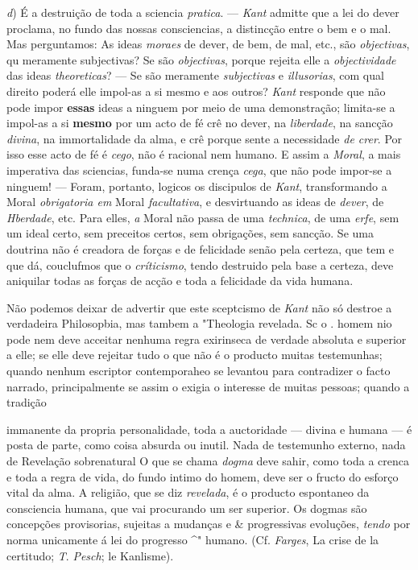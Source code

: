 \emph{d}) É a destruição de toda a sciencia \emph{pratica}. --- \emph{Kant} admitte que a lei do dever proclama, no fundo das nossas consciencias, a distincção entre o bem e o mal. Mas perguntamos: As ideas \emph{moraes} de dever, de bem, de mal, etc., são \emph{objectivas}, qu meramente subjectivas? Se são \emph{objectivas}, porque rejeita elle a \emph{objectividade} das ideas \emph{theoreticas}? --- Se são meramente \emph{subjectivas} e \emph{illusorias}, com qual direito poderá elle impol-as a si mesmo e aos outros? \emph{Kant} responde que não pode impor \textbf{essas} ideas a ninguem por meio de uma demonstração; limita-se a impol-as a si \textbf{mesmo} por um acto de fé crê no dever, na \emph{liberdade}, na sancção \emph{divina}, na immortalidade da alma, e crê porque sente a necessidade \emph{de crer}. Por isso esse acto de fé é \emph{cego}, não é racional nem humano. E assim a \emph{Moral}, a mais imperativa das sciencias, funda-se numa crença \emph{cega}, que não pode impor-se a ninguem! --- Foram, portanto, logicos os discipulos de \emph{Kant}, transformando a Moral \emph{obrigatoria em} Moral \emph{facultativa}, e desvirtuando as ideas de \emph{dever}, de \emph{Hberdade}, etc. Para elles, \emph{a} Moral não passa de uma \emph{technica}, de uma \emph{erfe}, sem um ideal certo, sem preceitos certos, sem obrigações, sem sancção. Se uma doutrina não é creadora de forças e de felicidade senão pela certeza, que tem e que dá, couclufmos que o \emph{críticismo}, tendo destruido pela base a certeza, deve aniquilar todas as forças de acção e toda a felicidade da vida humana.

Não podemos deixar de advertir que este sceptcismo de \emph{Kant} não só destroe a verdadeira Philosopbia, mas tambem a "Theologia revelada. Sc o . homem nio pode nem deve acceitar nenhuma regra exirinseca de verdade absoluta e superior a elle; se elle deve rejeitar tudo o que não é o producto   muitas testemunhas; quando nenhum escriptor contemporaheo se levantou para contradizer o facto narrado, principalmente se assim o exigia o interesse de muitas pessoas; quando a tradição

immanente da propria personalidade, toda a auctoridade --- divina e humana --- é posta de parte, como coisa absurda ou inutil. Nada de testemunho externo, nada de Revelação sobrenatural O que se chama \emph{dogma} deve sahir, como toda a crenca e toda a regra de vida, do fundo intimo do homem, deve ser o fructo do esforço vital da alma. A religião, que se diz \emph{revelada}, é o producto espontaneo da consciencia humana, que vai procurando um ser superior. Os dogmas são concepções provisorias, sujeitas a mudanças e \& progressivas evoluções, \emph{tendo} por norma unicamente á lei do progresso \textasciicircum{}" humano. (Cf. \emph{Farges}, La crise de la certitudo; \emph{T}. \emph{Pesch}; le Kanlisme).

